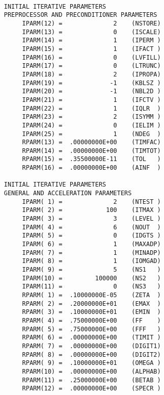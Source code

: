 \begin{verbatim}
 
     INITIAL ITERATIVE PARAMETERS
     PREPROCESSOR AND PRECONDITIONER PARAMETERS
          IPARM(12) =              2    (NSTORE)
          IPARM(13) =              0    (ISCALE)
          IPARM(14) =              1    (IPERM )
          IPARM(15) =              1    (IFACT )
          IPARM(16) =              0    (LVFILL)
          IPARM(17) =              0    (LTRUNC)
          IPARM(18) =              2    (IPROPA)
          IPARM(19) =             -1    (KBLSZ )
          IPARM(20) =             -1    (NBL2D )
          IPARM(21) =              1    (IFCTV )
          IPARM(22) =              1    (IQLR  )
          IPARM(23) =              2    (ISYMM )
          IPARM(24) =              0    (IELIM )
          IPARM(25) =              1    (NDEG  )
          RPARM(13) =  .00000000E+00    (TIMFAC)
          RPARM(14) =  .00000000E+00    (TIMTOT)
          RPARM(15) =  .35500000E-11    (TOL   )
          RPARM(16) =  .00000000E+00    (AINF  )
 
     INITIAL ITERATIVE PARAMETERS
     GENERAL AND ACCELERATION PARAMETERS
          IPARM( 1) =              2    (NTEST )
          IPARM( 2) =            100    (ITMAX )
          IPARM( 3) =              3    (LEVEL )
          IPARM( 4) =              6    (NOUT  )
          IPARM( 5) =              0    (IDGTS )
          IPARM( 6) =              1    (MAXADP)
          IPARM( 7) =              1    (MINADP)
          IPARM( 8) =              1    (IOMGAD)
          IPARM( 9) =              5    (NS1   )
          IPARM(10) =         100000    (NS2   )
          IPARM(11) =              0    (NS3   )
          RPARM( 1) =  .10000000E-05    (ZETA  )
          RPARM( 2) =  .20000000E+01    (EMAX  )
          RPARM( 3) =  .10000000E+01    (EMIN  )
          RPARM( 4) =  .75000000E+00    (FF    )
          RPARM( 5) =  .75000000E+00    (FFF   )
          RPARM( 6) =  .00000000E+00    (TIMIT )
          RPARM( 7) =  .00000000E+00    (DIGIT1)
          RPARM( 8) =  .00000000E+00    (DIGIT2)
          RPARM( 9) =  .10000000E+01    (OMEGA )
          RPARM(10) =  .00000000E+00    (ALPHAB)
          RPARM(11) =  .25000000E+00    (BETAB )
          RPARM(12) =  .00000000E+00    (SPECR )
\end{verbatim}
\newpage
